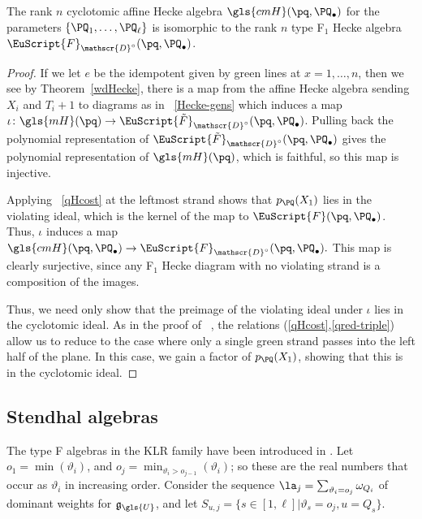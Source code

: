 \begin{prop}\label{prop:cyclo-Hecke}
 The rank $n$ cyclotomic affine Hecke algebra $\gls{cmH}(\pq,\PQ_\bullet)$ for the parameters $\{\PQ_1,\dots,
 \PQ_\ell\}$ is isomorphic to the rank $n$ type F$_1$ Hecke algebra
 $\EuScript{F}_{\mathscr{D}^\circ} (\pq,\PQ_{\bullet})$.
\end{prop}
\begin{proof}
 If we let $e$ be the idempotent given by green lines at $x=1,\dots, 
 n$, then we see by Theorem~\ref{wdHecke}, there is a map from the
 affine Hecke algebra sending $X_i$ and $T_i+1$ to diagrams as in
~\eqref{Hecke-gens} which induces a map
 $\iota\colon \gls{mH}(\pq)\to \EuScript{\tilde F}_{\mathscr{D}^\circ}
 (\pq,\PQ_{\bullet})$. 
Pulling back the polynomial representation of $\EuScript{\tilde F}_{\mathscr{D}^\circ}
 (\pq,\PQ_{\bullet})$ gives the polynomial representation of
 $\gls{mH}(\pq)$, which is faithful, so this map is injective.

 Applying 
~\eqref{qHcost} at the leftmost strand shows that $p_\PQ(X_1)$ lies
 in the violating ideal, which is the kernel of the map to
 $\EuScript{F}(\pq,\PQ_{\bullet})$. Thus, $\iota$ induces a
 map $\gls{cmH}(\pq,\PQ_\bullet)\to \EuScript{F}_{\mathscr{D}^\circ}
 (\pq,\PQ_{\bullet}). $ This map is clearly surjective, since any
 F$_1$ Hecke diagram with no violating strand is a composition of the
 images.
 
 Thus, we need only show that the preimage of
 the violating ideal under $\iota$ lies in the cyclotomic ideal. As in the proof of
~\cite[3.16]{Webmerged}, the relations (\ref{qHcost},\ref{qred-triple})
 allow us to reduce to the case where only a single green strand
 passes into the left half of the plane. In this case, we gain a
 factor of $p_\PQ(X_1)$, showing that this is in the cyclotomic
 ideal. 
\end{proof}

\subsection{Stendhal algebras}
\label{sec:stendhal-algebras}


The type F algebras in the KLR family have been introduced in
\cite{Webmerged}. 
Let $o_1=\min(\vartheta_i)$, and
$o_j=\min_{\vartheta_i>o_{j-1}}(\vartheta_i)$; so these are the real
numbers that occur as $\vartheta_i$ in increasing order.
Consider the sequence $\la_j=\sum_{\vartheta_i=o_j}\omega_{Q_i}$ of
dominant weights for $\mathfrak{g}_{\gls{U}}$, and let $S_{u,j}=\{s\in
[1,\ell]|\vartheta_s=o_j, u=Q_s\}$.

